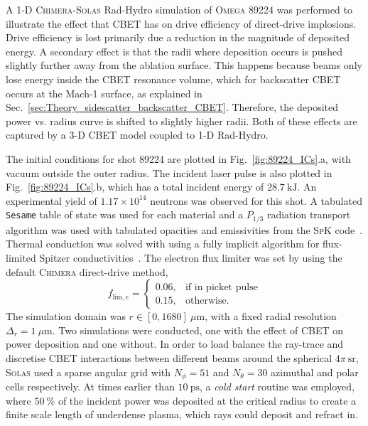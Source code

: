 A 1-D \textsc{Chimera}-\textsc{Solas} \ac{Rad-Hydro} simulation of \textsc{Omega} 89224 was performed to illustrate the effect that \ac{CBET} has on drive efficiency of direct-drive implosions.
Drive efficiency is lost primarily due a reduction in the magnitude of deposited energy.
A secondary effect is that the radii where deposition occurs is pushed slightly further away from the ablation surface.
This happens because beams only lose energy inside the \ac{CBET} resonance volume, which for backscatter \ac{CBET} occurs at the Mach-1 surface, as explained in Sec.~\ref{sec:Theory_sidescatter_backscatter_CBET}.
Therefore, the deposited power vs. radius curve is shifted to slightly higher radii.
Both of these effects are captured by a 3-D \ac{CBET} model coupled to 1-D \ac{Rad-Hydro}.

The initial conditions for shot 89224 are plotted in Fig.~\ref{fig:89224_ICs}.a, with vacuum outside the outer radius.
The incident laser pulse is also plotted in Fig.~\ref{fig:89224_ICs}.b, which has a total incident energy of $28.7\  \text{kJ}$.
An experimental yield of $1.17\times 10^{14}$ neutrons was observed for this shot.
A tabulated \texttt{Sesame} table of state was used for each material \cite{mchardy_introduction_2018} and a $P_{1/3}$ radiation transport algorithm was used with tabulated opacities and emissivities from the \textsc{SpK} code~\cite{crilly_spk_2023}.
Thermal conduction was solved with using a fully implicit algorithm for flux-limited Spitzer conductivities~\cite{spitzer_transport_1953}.
The electron flux limiter was set by using the default \textsc{Chimera} direct-drive method,
\begin{equation}
    \label{eq:SOLAS_flime}
    f_{\text{lim},e} = 
    \begin{cases}
        0.06, & \text{if in picket pulse}\\
        0.15, & \text{otherwise}.
    \end{cases}
\end{equation}
The simulation domain was $r\in [0,1680]\ \mu\text{m}$, with a fixed radial resolution $\Delta_r = 1\ \mu\text{m}$.
Two simulations were conducted, one with the effect of \ac{CBET} on power deposition and one without.
In order to load balance the ray-trace and discretise \ac{CBET} interactions between different beams around the spherical $4\pi\ \text{sr}$, \textsc{Solas} used a sparse angular grid with $N_{\phi}=51$ and $N_{\theta}=30$ azimuthal and polar cells respectively.
At times earlier than $10\ \text{ps}$, a \textit{cold start} routine was employed, where $50\ \%$ of the incident power was deposited at the critical radius to create a finite scale length of underdense plasma, which rays could deposit and refract in.
